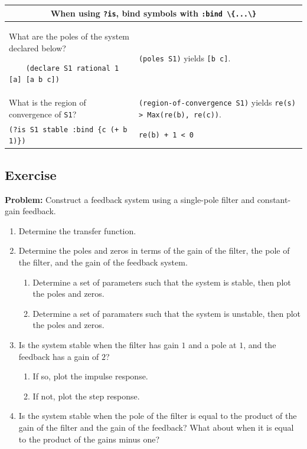 \documentclass[11pt,letter]{article}
\begin{document}
\begin{longtable}{ p{} p{} }
  \midrule

  \multicolumn{2}{c}{\Large When using \lstinline!?is!, bind symbols with \lstinline!:bind \{...\}!} \\

  \midrule

  What are the poles of the system declared below?
  \begin{lstlisting}
    (declare S1 rational 1 [a] [a b c])
  \end{lstlisting}
  &
  \lstinline!(poles S1)! yields \lstinline![b c]!. \\

  What is the region of convergence of \lstinline!S1!?
  &
  \lstinline!(region-of-convergence S1)! yields \lstinline!re(s) > Max(re(b), re(c))!. \\

  \lstinline!(?is S1 stable :bind {c (+ b 1)})!
  &
  \lstinline!re(b) + 1 < 0! \\

  \midrule

  \bottomrule

\end{longtable}

\subsection{Exercise}\label{sec:tutorial:exercise}

\noindent\textbf{Problem:} Construct a feedback system using a single-pole filter and constant-gain feedback.
%
\begin{enumerate}
\item Determine the transfer function.
\item Determine the poles and zeros in terms of the gain of the filter, the pole of the filter, and the gain of the feedback system.
  \begin{enumerate}
  \item Determine a set of parameters such that the system is stable, then plot the poles and zeros.
  \item Determine a set of paramaters such that the system is unstable, then plot the poles and zeros.
  \end{enumerate}
\item Is the system stable when the filter has gain $1$ and a pole at $1$, and the feedback has a gain of $2$?
  \begin{enumerate}
  \item If so, plot the impulse response.
  \item If not, plot the step response.
  \end{enumerate}
\item Is the system stable when the pole of the filter is equal to the product of the gain of the filter and the gain of the feedback? What about when it is equal to the product of the gains minus one?
\end{enumerate}
\end{document}
